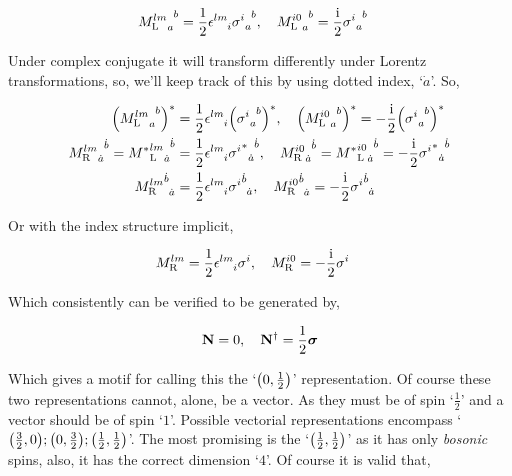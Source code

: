 \begin{align}
    \tensor{{M_{\textnormal L}^{lm}}}{_a^b}&=\frac12\tensor{\epsilon}{^l^m_i}\tensor{{\sigma^i}}{_a^b},\ \ \ \tensor{{M_{\textnormal L}^{i0}}}{_a^b}=\frac\im2\tensor{{\sigma^i}}{_a^b}\nonumber
\end{align}

Under complex conjugate it will transform differently under Lorentz transformations, so, we'll keep track of this by using dotted index, `$\dot a$'. So,

\begin{align}
    \qty(\tensor{{M_{\textnormal L}^{lm}}}{_a^b})^\ast&=\frac12\tensor{\epsilon}{^l^m_i}\qty(\tensor{{\sigma^i}}{_a^b})^\ast,\ \ \ \qty(\tensor{{M_{\textnormal L}^{i0}}}{_a^b})^\ast=-\frac\im2\qty(\tensor{{\sigma^i}}{_a^b})^\ast\nonumber\\
    \tensor{{{M}_{\textnormal R}^{lm}}}{_{\dot a}^{\dot b}}=\tensor{{{M^\ast}_{\textnormal L}^{lm}}}{_{\dot a}^{\dot b}}&=\frac12\tensor{\epsilon}{^l^m_i}\tensor{{{\sigma^i}^\ast}}{_{\dot a}^{\dot b}},\ \ \ \tensor{{M_{\textnormal R}^{i0}}}{_{\dot a}^{\dot b}}=\tensor{{{M^\ast}_{\textnormal L}^{i0}}}{_{\dot a}^{\dot b}}=-\frac\im2\tensor{{{\sigma^i}^\ast}}{_{\dot a}^{\dot b}}\nonumber\\
    \tensor{{{M}_{\textnormal R}^{lm}}}{^{\dot b}_{\dot a}}&=\frac12\tensor{\epsilon}{^l^m_i}\tensor{{{\sigma^i}}}{^{\dot b}_{\dot a}},\ \ \ \tensor{{M_{\textnormal R}^{i0}}}{^{\dot b}_{\dot a}}=-\frac\im2\tensor{{{\sigma^i}}}{^{\dot b}_{\dot a}}\nonumber
\end{align}

Or with the index structure implicit,

\begin{align}
    M_{\textnormal R}^{lm}&=\frac12\tensor{\epsilon}{^l^m_i}{\sigma^i},\ \ \ M_{\textnormal R}^{i0}=-\frac\im2{\sigma^i}\nonumber
\end{align}

Which consistently can be verified to be generated by,

\begin{align}
    \vb N = 0,\ \ \ {\vb N}^\dagger=\frac12{\boldsymbol\sigma}\nonumber
\end{align}

Which gives a motif for calling this the `$\qty(0,\frac12)$' representation. Of course these two representations cannot, alone, be a vector. As they must be of spin `$\frac12$' and a vector should be of spin `$1$'. Possible vectorial representations encompass `$\qty(\frac32,0);\qty(0,\frac32);\qty(\frac12,\frac12)$'. The most promising is the `$\qty(\frac12,\frac12)$' as it has only \textit{bosonic} spins, also, it has the correct dimension `$4$'. Of course it is valid that,

